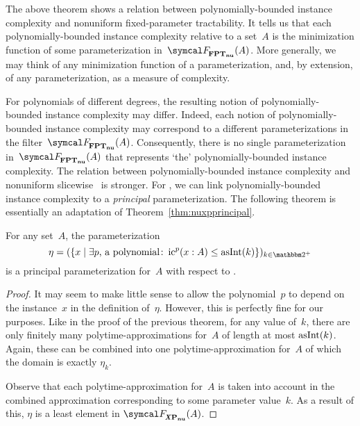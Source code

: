 The above theorem shows a relation between polynomially-bounded instance complexity and nonuniform fixed-parameter tractability.
It tells us that each polynomially-bounded instance complexity relative to a set~$A$ is the minimization function of some parameterization in~$\calF_\clnu{FPT}(A)$.
More generally, we may think of any minimization function of a parameterization, and, by extension, of any parameterization, as a measure of complexity.

For polynomials of different degrees, the resulting notion of polynomially-bounded instance complexity may differ.
Indeed, each notion of polynomially-bounded instance complexity may correspond to a different parameterizations in the filter~$\calF_\clnu{FPT}(A)$.
Consequently, there is no single parameterization in~$\calF_\clnu{FPT}(A)$ that represents \enquote*{the} polynomially-bounded instance complexity.
The relation between polynomially-bounded instance complexity and nonuniform slicewise~ is stronger.
For , we can link polynomially-bounded instance complexity to a \emph{principal} parameterization.
The following theorem is essentially an adaptation of Theorem~\ref{thm:nuxpprincipal}.
\begin{theorem}
\label{thm:nuxpic}%
  For any set~$A$, the parameterization
  \begin{equation*}
   \eta \deq (\{x \st \exists p\text{, a polynomial}\colon \ic^p(x : A) \le \asNat(k)\})_{k \in \binary^+}
  \end{equation*}
  is a principal parameterization for~$A$ with respect to .
\end{theorem}
\begin{proof}
  It may seem to make little sense to allow the polynomial~$p$ to depend on the instance~$x$ in the definition of~$\eta$.
  However, this is perfectly fine for our purposes.
  Like in the proof of the previous theorem, for any value of~$k$, there are only finitely many polytime-approximations for~$A$ of length at most $\operatorname{asInt}(k)$.
  Again, these can be combined into one polytime-approximation for~$A$ of which the domain is exactly $\eta_k$.

  Observe that each polytime-approximation for~$A$ is taken into account in the combined approximation corresponding to some parameter value~$k$.
  As a result of this, $\eta$ is a least element in $\calF_\clXnu{P}(A)$.
\end{proof}

